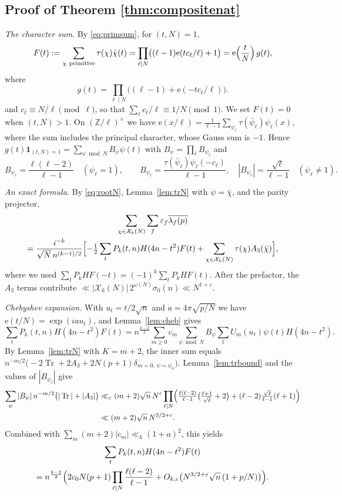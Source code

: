 \documentclass[11pt]{amsart}
\theoremstyle{remark}
\newcommand{\eps}{\varepsilon}
\newcommand{\e}{\mathrm{e}}
\newcommand{\cX}{\mathcal{X}}
\newcommand{\ov}{\overline}
\newcommand{\Tr}{\operatorname{Tr}}
\begin{document}
\subsection{Proof of Theorem \ref{thm:compositenat}}
\emph{The character sum.} By \eqref{eq:primsum}, for $(t,N)=1$,
\[
F(t):=\sum_{\chi\ \mathrm{primitive}}\tau(\chi)\bar\chi(t)=\prod_{\ell\mid N}\bigl((\ell-1)\e(tc_\ell/\ell)+1\bigr)=\e\Bigl(\frac tN\Bigr)\,g(t),
\]
where
\[
g(t)=\prod_{\ell\mid N}\bigl((\ell-1)+\e(-tc_\ell/\ell)\bigr).
\]
and $c_\ell\equiv\overline{N/\ell}\pmod\ell$, so that $\sum_\ell c_\ell/\ell\equiv1/N\pmod1$. We set $F(t)=0$ when $(t,N)>1$. On $(\mathbb Z/\ell)^\times$ we have $\e(x/\ell)=\frac1{\ell-1}\sum_{\psi_\ell}\tau(\bar\psi_\ell)\psi_\ell(x)$, where the sum includes the principal character, whose Gauss sum is $-1$. Hence $g(t)\mathbf 1_{(t,N)=1}=\sum_{\psi\bmod N}B_\psi\psi(t)$ with $B_\psi=\prod_\ell B_{\psi_\ell}$ and
\[
B_{\psi_\ell}=\frac{\ell(\ell-2)}{\ell-1}\quad(\psi_\ell=1),\qquad B_{\psi_\ell}=\frac{\tau(\bar\psi_\ell)\psi_\ell(-c_\ell)}{\ell-1},\quad|B_{\psi_\ell}|=\frac{\sqrt\ell}{\ell-1}\quad(\psi_\ell\ne1).
\]

\emph{An exact formula.} By \eqref{eq:rootN}, Lemma~\ref{lem:trN} with $\psi=\bar\chi$, and the parity projector,
\begin{multline*}
\sum_{\chi\in\cX_k(N)}\sum_f\eps_f\ov{\lambda_f(p)}\\
=\frac{i^{-k}}{\sqrt N\,n^{(k-1)/2}}\Bigl[-\tfrac12\sum_tP_k(t,n)H(4n-t^2)F(t)+\sum_{\chi\in\cX_k(N)}\tau(\chi)A_3(\bar\chi)\Bigr],
\end{multline*}
where we used $\sum_tP_kHF(-t)=(-1)^k\sum_tP_kHF(t)$. After the prefactor, the $A_3$ terms contribute $\ll|\cX_k(N)|\,2^{\omega(N)}\sigma_0(n)\ll N^{1+\varepsilon}$.

\emph{Chebyshev expansion.} With $u_t=t/2\sqrt n$ and $a=4\pi\sqrt{p/N}$ we have $\e(t/N)=\exp(iau_t)$, and Lemma~\ref{lem:cheb} gives
\[
\sum_tP_k(t,n)H(4n-t^2)F(t)=n^{\frac{k-2}2}\sum_{m\ge0}c_m\sum_{\psi\bmod N}B_\psi\sum_tU_m(u_t)\psi(t)H(4n-t^2).
\]
By Lemma~\ref{lem:trN} with $K=m+2$, the inner sum equals $n^{-m/2}\bigl(-2\Tr+2A_3+2N(p+1)\delta_{m=0,\,\psi=\psi_0}\bigr)$. Lemma~\ref{lem:trbound} and the values of $|B_{\psi_\ell}|$ give
\begin{align*}
\sum_\psi|B_\psi|\,n^{-m/2}\bigl(|\Tr|+|A_3|\bigr)&\ll_\varepsilon(m+2)\sqrt n\,N^{\varepsilon}\prod_{\ell\mid N}\Bigl(\tfrac{\ell(\ell-2)}{\ell-1}\bigl(\tfrac{\ell+1}{\sqrt\ell}+2\bigr)+(\ell-2)\tfrac{\sqrt\ell}{\ell-1}(\ell+1)\Bigr)\\
&\ll(m+2)\sqrt n\,N^{3/2+\varepsilon}.
\end{align*}
Combined with $\sum_m(m+2)|c_m|\ll_k(1+a)^2$, this yields
\begin{multline*}
\sum_tP_k(t,n)H(4n-t^2)F(t)\\
=n^{\frac{k-2}2}\Bigl(2c_0N(p+1)\prod_{\ell\mid N}\frac{\ell(\ell-2)}{\ell-1}+O_{k,\varepsilon}\bigl(N^{3/2+\varepsilon}\sqrt n\,(1+p/N)\bigr)\Bigr).
\end{multline*}
\end{document}
